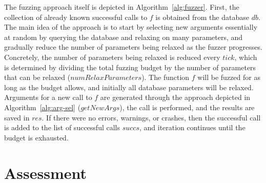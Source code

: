 \documentclass[sigplan,nonacm,anonymous,review]{acmart}
\begin{document}
The fuzzing approach itself is depicted in Algorithm~\ref{alg:fuzzer}.
First, the collection of already known successful calls to $f$ is obtained from the database $db$.
The main idea of the approach is to start by selecting new arguments essentially at random by querying the database and relaxing on many parameters, and gradually reduce the number of parameters being relaxed as the fuzzer progresses.
Concretely, the number of parameters being relaxed is reduced every $tick$, which is determined by dividing the total fuzzing budget by the number of parameters that can be relaxed ($numRelaxParameters$).
The function $f$ will be fuzzed for as long as the budget allows, and initially all database parameters will be relaxed.
Arguments for a new call to $f$ are generated through the approach depicted in Algorithm~\ref{alg:arg-sel} ($getNewArgs$), the call is performed, and the results are saved in $res$.
If there were no errors, warnings, or crashes, then the successful call is added to the list of successful calls $succs$, and iteration continues until the budget is exhausted.



%
%

\section{Assessment}
\label{sec:assessment}
\end{document}
